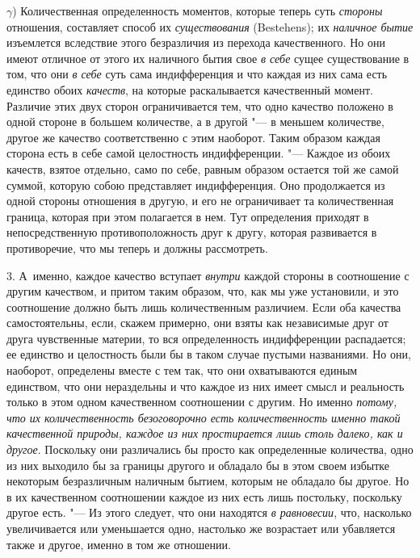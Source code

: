 $\gamma$) Количественная определенность моментов,
которые теперь суть {\em стороны} отношения, составляет
способ их {\em существования} (Bestehens); их
{\em наличное бытие} изъемлется вследствие этого
безразличия из перехода качественного. Но они имеют отличное от этого их
наличного бытия свое {\em в себе} сущее существование в
том, что они {\em в себе} суть сама индифференция и что
каждая из них сама есть единство обоих {\em качеств},
на которые раскалывается качественный момент. Различие этих двух сторон
ограничивается тем, что одно качество положено в одной стороне в большем
количестве, а в другой "--- в меньшем количестве, другое же качество
соответственно с этим наоборот. Таким образом каждая сторона есть в себе
самой целостность индифференции. "--- Каждое из обоих качеств, взятое отдельно,
само по себе, равным образом остается той же самой суммой, которую собою
представляет индифференция. Оно продолжается из одной стороны отношения в
другую, и его не ограничивает та количественная граница, которая при этом
полагается в нем. Тут определения приходят в непосредственную
противоположность друг к другу, которая развивается в противоречие, что мы
теперь и должны рассмотреть.

3. А~именно, каждое качество вступает {\em внутри}
каждой стороны в соотношение с другим качеством, и притом таким образом,
что, как мы уже установили, и это соотношение должно быть лишь
количественным различием. Если оба качества самостоятельны, если, скажем
примерно, они взяты как независимые друг от друга чувственные материи, то
вся определенность индифференции распадается; ее единство и целостность были
бы в таком случае пустыми названиями. Но они, наоборот, определены вместе с
тем так, что они охватываются единым единством, что они нераздельны и что
каждое из них имеет смысл и реальность только в этом одном качественном
соотношении с другим. Но именно {\em потому, что их
количественность безоговорочно есть количественность именно такой
качественной природы, каждое из них простирается лишь столь далеко, как и
другое}. Поскольку они различались бы просто как определенные количества,
одно из них выходило бы за границы другого и обладало бы в этом своем
избытке некоторым безразличным наличным бытием, которым не обладало бы
другое. Но в их качественном соотношении каждое из них есть лишь постольку,
поскольку другое есть. "--- Из этого следует, что они находятся
{\em в равновесии}, что, насколько увеличивается или
уменьшается одно, настолько же возрастает или убавляется также и другое,
именно в том же отношении.


